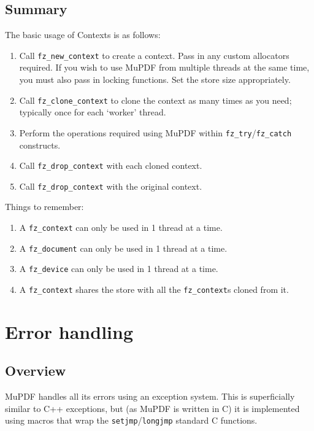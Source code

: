 \documentclass[oneside]{book}
\begin{document}
\section{Summary}

The basic usage of Contexts is as follows:

\begin{enumerate}
\item Call \texttt{fz\_new\_context} to create a context. Pass in any custom allocators required. If you wish to use MuPDF from multiple threads at the same time, you must also pass in locking functions. Set the store size appropriately.
\item Call \texttt{fz\_clone\_context} to clone the context as many times as you need; typically once for each `worker' thread.
\item Perform the operations required using MuPDF within \texttt{fz\_try}/\texttt{fz\_catch} constructs.
\item Call \texttt{fz\_drop\_context} with each cloned context.
\item Call \texttt{fz\_drop\_context} with the original context.
\end{enumerate}

Things to remember:

\begin{enumerate}
\item A \texttt{fz\_context} can only be used in 1 thread at a time.
\item A \texttt{fz\_document} can only be used in 1 thread at a time.
\item A \texttt{fz\_device} can only be used in 1 thread at a time.
\item A \texttt{fz\_context} shares the store with all the \texttt{fz\_context}s cloned from it.
\end{enumerate}



\chapter{Error handling}
\label{ErrorHandling}

\section{Overview}

MuPDF handles all its errors using an exception system. This is superficially similar to C++ exceptions, but (as MuPDF is written in C) it is implemented using macros that wrap the \texttt{setjmp}\slash \texttt{longjmp} standard C functions.
\end{document}
